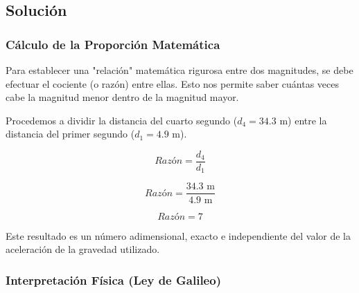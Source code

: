 \documentclass[12pt, a4paper]{article}
\begin{document}
\vspace{0.5cm}

\begin{center}
\end{center}

\subsection*{Solución}

\subsubsection*{Cálculo de la Proporción Matemática}

Para establecer una "relación" matemática rigurosa entre dos magnitudes, se debe efectuar el cociente (o razón) entre ellas. Esto nos permite saber cuántas veces cabe la magnitud menor dentro de la magnitud mayor. 

Procedemos a dividir la distancia del cuarto segundo ($d_4 = 34.3 \text{ m}$) entre la distancia del primer segundo ($d_1 = 4.9 \text{ m}$).

\begin{equation}
Razón = \frac{d_4}{d_1}
\end{equation}

\begin{equation}
Razón = \frac{34.3 \text{ m}}{4.9 \text{ m}}
\end{equation}

\begin{equation}
Razón = 7
\end{equation}

Este resultado es un número adimensional, exacto e independiente del valor de la aceleración de la gravedad utilizado.

\subsubsection*{Interpretación Física (Ley de Galileo)}
\end{document}
